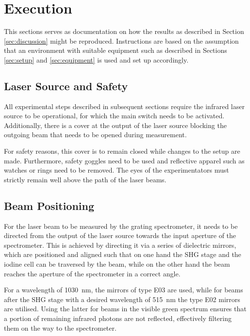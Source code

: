 \section{Execution}
\label{sec:execution}

This sections serves as documentation on how the results as described in Section \ref{sec:discussion} might be reproduced. Instructions are based on the assumption that an environment with suitable equipment such as described in Sections \ref{sec:setup} and \ref{sec:equipment} is used and set up accordingly.

\subsection{Laser Source and Safety}
\label{sec:laser-source-and-safety}

All experimental steps described in subsequent sections require the infrared laser source to be operational, for which the main switch needs to be activated. Additionally, there is a cover at the output of the laser source blocking the outgoing beam that needs to be opened during measurement.

For safety reasons, this cover is to remain closed while changes to the setup are made. Furthermore, safety goggles need to be used and reflective apparel such as watches or rings need to be removed. The eyes of the experimentators must strictly remain well above the path of the laser beams.

\subsection{Beam Positioning}
\label{sec:execution:beam-positioning}

For the laser beam to be measured by the grating spectrometer, it needs to be directed from the output of the laser source towards the input aperture of the spectrometer. This is achieved by directing it via a series of dielectric mirrors, which are positioned and aligned such that on one hand the SHG stage and the iodine cell can be traversed by the beam, while on the other hand the beam reaches the aperture of the spectrometer in a correct angle.

For a wavelength of \SI{1030}{\nm}, the mirrors of type E03 are used, while for beams after the SHG stage with a desired wavelength of \SI{515}{\nm} the type E02 mirrors are utilised. Using the latter for beams in the visible green spectrum ensures that a portion of remaining infrared photons are not reflected, effectively filtering them on the way to the spectrometer.

